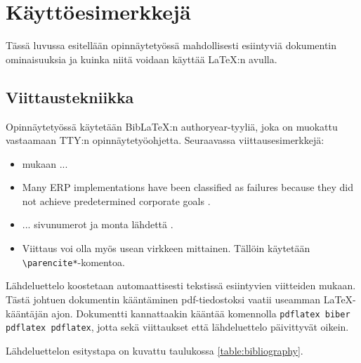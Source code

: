 \chapter{Käyttöesimerkkejä}

Tässä luvussa esitellään opinnäytetyössä mahdollisesti esiintyviä dokumentin ominaisuuksia ja kuinka niitä voidaan käyttää \LaTeX:n avulla. 

\section{Viittaustekniikka}

Opinnäytetyössä käytetään BibLaTeX:n authoryear-tyyliä, joka on muokattu vastaamaan TTY:n opinnäytetyöohjetta. Seuraavassa viittausesimerkkejä:

\begin{itemize}
	\item \textcite[ss.~32--34]{lehman2014biblatex} mukaan ...
	\item Many ERP implementations have been classified as failures because they did not achieve predetermined corporate goals \cite{umble2003enterprise}.
	\item ... sivunumerot ja monta lähdettä \cites[189]{osmani2013}[1]{knuth1973fundamental}.
	\item Viittaus voi olla myös usean virkkeen mittainen. Tällöin käytetään \verb+\parencite*+-komentoa. \cite*{somers2001impact}
\end{itemize}

Lähdeluettelo koostetaan automaattisesti tekstissä esiintyvien viitteiden mukaan.
Tästä johtuen dokumentin kääntäminen pdf-tiedostoksi vaatii useamman \LaTeX-kääntäjän ajon.
Dokumentti kannattaakin kääntää komennolla \texttt{pdflatex biber pdflatex pdflatex}, jotta sekä viittaukset että lähdeluettelo päivittyvät oikein.

Lähdeluettelon esitystapa on kuvattu taulukossa \ref{table:bibliography}.

